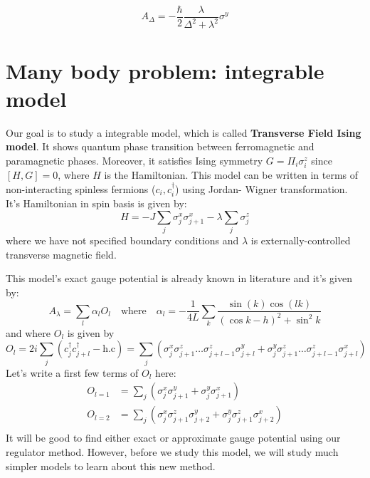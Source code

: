 \documentclass[11pt,a4paper]{article}
\begin{document}
\begin{equation}
A_{\Delta}= -\dfrac{\hbar}{2}\dfrac{\lambda }{\Delta^2 + \lambda^2} \sigma^y
\end{equation}


\section{Many body problem: integrable model}
Our goal is to study a integrable model, which is called \textbf{Transverse Field Ising model}. It shows quantum phase transition between ferromagnetic and paramagnetic phases. Moreover, it satisfies Ising symmetry $G= \Pi_i \sigma_i^z$ since $[H, G]=0$, where $H$ is the Hamiltonian.
This model can be written in terms of non-interacting spinless fermions ($c_i, c^{\dagger}_i $) using Jordan- Wigner transformation. It's Hamiltonian in spin basis is given by:
\begin{equation}
H= -J \sum_{j} \sigma_j^x \sigma_{j+1}^x - \lambda \sum_{j} \sigma_j^z 
\label{xx_z}
\end{equation}
where we have not specified boundary conditions and $\lambda$ is externally-controlled transverse magnetic field.

This model's exact gauge potential is already known in literature \cite{del2012assisted, kolodrubetz2016geometry} and it's given by:
\begin{equation}
A_{\lambda}= \sum_l \alpha_l O_l \quad \mbox{where} \quad \alpha_l= -\dfrac{1}{4 L} \sum_k \dfrac{\sin(k) \cos(lk)}{(\cos k - h)^2 + \sin^2 k}
\end{equation}
and where  $O_l$ is given by
\begin{equation}
O_l= 2 i \sum_j (c^{\dagger}_{j} c^{\dagger}_{j+l} - \mbox{h.c})= \sum_j ( \sigma_j^x \sigma_{j+1}^z \ldots \sigma_{j+l-1}^z \sigma_{j+l}^y +  \sigma_j^y \sigma_{j+1}^z \ldots \sigma_{j+l-1}^z \sigma_{j+l}^x)
\end{equation}
Let's write a first few terms of $O_l$ here:
\begin{align*}
O_{l=1}&=  \sum_j ( \sigma_j^x  \sigma_{j+1}^y +  \sigma_j^y  \sigma_{j+1}^x) \\
O_{l=2} &=  \sum_j ( \sigma_j^x \sigma_{j+1}^z \sigma_{j+2}^y +  \sigma_j^y \sigma_{j+1}^z \sigma_{j+2}^x) \\
\end{align*}
It will be good to find either exact or approximate gauge potential using our regulator method. However, before we study this model, we will study much simpler models to learn about this new method.
\end{document}
